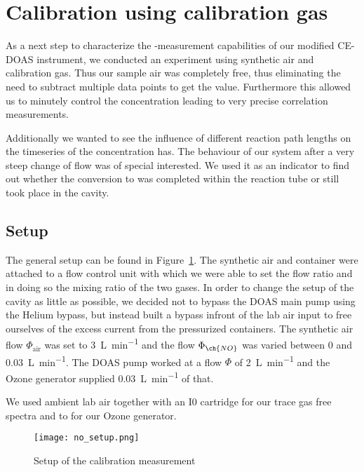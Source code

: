 \section{Calibration using calibration gas}
\label{sec:no}

As a next step to characterize the -measurement capabilities of
our modified CE-DOAS instrument, we conducted an experiment using
synthetic air and  calibration gas. Thus our sample air
was completely  free, thus eliminating the need to subtract
multiple data points to get the  value. Furthermore this
allowed us to minutely control the  concentration leading to
very precise correlation measurements.

Additionally we wanted to see the influence of different reaction path
lengths on the timeseries of the  concentration has. The
behaviour of our system  after a very steep change of flow was of
special interested. We used it as an indicator to find out whether the
 conversion to  was completed within the reaction tube
or still took place in the cavity.

\subsection{Setup}
\label{sec:no-setup}

The general setup can be found in Figure~\ref{fig:no-setup}. The
synthetic air and  container were attached to a flow control
unit with which we were able to set the flow ratio and in doing so the
mixing ratio of the two gases. In order to change the setup of the
cavity as little as possible, we decided not to bypass the DOAS main
pump using the Helium bypass, but instead built a bypass infront of
the lab air input to free ourselves of the excess current from the
pressurized containers. The synthetic air flow $\Phi_\text{air}$ was
set to \SI{3}{\liter\per\minute} and the  flow $\Phi_{\ch{NO}}$
was varied between \num{0} and \SI{0.03}{\liter\per\minute}. The DOAS
pump worked at a flow $\Phi$ of \SI{2}{\liter\per\minute} and the
Ozone generator supplied \SI{0.03}{\liter\per\minute} of that.

We used ambient lab air together with an I0 cartridge for our trace
gas free spectra and to for our Ozone generator.

\begin{figure}[htbp]
  \centering
  \texttt{[image: no\_setup.png]}
  \caption{Setup of the calibration measurement}
  \label{fig:no-setup}
\end{figure}

